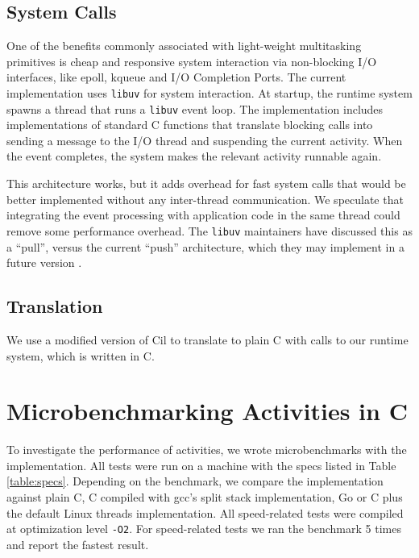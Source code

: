 \documentclass[acmsmall,anonymous,review]{acmart}\settopmatter{printfolios=true,printccs=false,printacmref=false}
\begin{document}
\subsection{System Calls}

One of the benefits commonly associated with light-weight multitasking primitives is cheap and responsive system interaction via non-blocking I/O interfaces, like epoll, kqueue and I/O Completion Ports.
The current \charcoal{} implementation uses \texttt{libuv} for system interaction.
At startup, the runtime system spawns a thread that runs a \texttt{libuv} event loop.
The \charcoal{} implementation includes implementations of standard C functions that translate blocking calls into sending a message to the I/O thread and suspending the current activity.
When the event completes, the system makes the relevant activity runnable again.

This architecture works, but it adds overhead for fast system calls that would be better implemented without any inter-thread communication.
We speculate that integrating the event processing with application code in the same thread could remove some performance overhead.
The \texttt{libuv} maintainers have discussed this as a ``pull'', versus the current ``push'' architecture, which they may implement in a future version \cite{libuv2014}.

\subsection{Translation}

We use a modified version of Cil \cite{Necula2002} to translate \charcoal{} to plain C with calls to our runtime system, which is written in C.

\section{Microbenchmarking Activities in C}

To investigate the performance of activities, we wrote microbenchmarks with the \charcoal{} implementation.
All tests were run on a machine with the specs listed in Table \ref{table:specs}.
Depending on the benchmark, we compare the \charcoal{} implementation against plain C, C compiled with gcc's split stack implementation, Go or C plus the default Linux threads implementation.
All speed-related tests were compiled at optimization level \texttt{-O2}.
For speed-related tests we ran the benchmark 5 times and report the fastest result.
\end{document}
